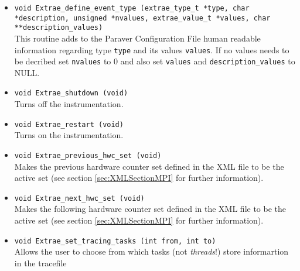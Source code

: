 \begin{itemize}
 \item {\tt void Extrae\_define\_event\_type (extrae\_type\_t *type, char *description, unsigned *nvalues, extrae\_value\_t *values, char **description\_values)}\\
 This routine adds to the Paraver Configuration File human readable information regarding type {\tt type} and its values {\tt values}. If no values needs to be decribed set {\tt nvalues} to 0 and also set {\tt values} and {\tt description\_values} to NULL.

 \item {\tt void Extrae\_shutdown (void)}\\
  Turns off the instrumentation.

 \item {\tt void Extrae\_restart (void)}\\
  Turns on the instrumentation.

 \item {\tt void Extrae\_previous\_hwc\_set (void)}\\
  Makes the previous hardware counter set defined in the XML file to be the active set (see section \ref{sec:XMLSectionMPI} for further information).

 \item {\tt void Extrae\_next\_hwc\_set (void)}\\
  Makes the following hardware counter set defined in the XML file to be the active set (see section \ref{sec:XMLSectionMPI} for further information).

 \item {\tt void Extrae\_set\_tracing\_tasks (int from, int to)}\\
  Allows the user to choose from which tasks (not {\em threads}!) store informartion in the tracefile


\end{itemize}

